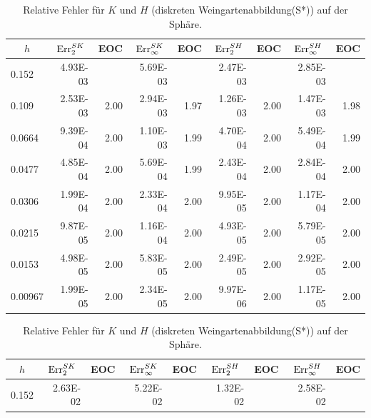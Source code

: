   
   \begin{table}[htbp]
      \begin{tabular}{|l|r|r|r|r|r|r|r|r|}
      \hline
      \multicolumn{1}{|c|}{\rule{0pt}{11pt}\( h \)} & \multicolumn{1}{c|}{\( \text{Err}_{2}^{SK} \)} & \multicolumn{1}{c|}{EOC} & 
           \multicolumn{1}{c|}{\( \text{Err}_{\infty}^{SK} \)} & \multicolumn{1}{c|}{EOC} & \multicolumn{1}{c|}{\( \text{Err}_{2}^{SH} \)} &
           \multicolumn{1}{c|}{EOC} & \multicolumn{1}{c|}{\( \text{Err}_{\infty}^{SH} \)} & \multicolumn{1}{c|}{EOC} \\ \hline
      0.152 & 4.93E-03 & \multicolumn{1}{l|}{} & 5.69E-03 & \multicolumn{1}{l|}{} & 2.47E-03 & \multicolumn{1}{l|}{} & 2.85E-03 & \multicolumn{1}{l|}{} \\ \hline
      0.109 & 2.53E-03 & 2.00 & 2.94E-03 & 1.97 & 1.26E-03 & 2.00 & 1.47E-03 & 1.98 \\ \hline
      0.0664 & 9.39E-04 & 2.00 & 1.10E-03 & 1.99 & 4.70E-04 & 2.00 & 5.49E-04 & 1.99 \\ \hline
      0.0477 & 4.85E-04 & 2.00 & 5.69E-04 & 1.99 & 2.43E-04 & 2.00 & 2.84E-04 & 2.00 \\ \hline
      0.0306 & 1.99E-04 & 2.00 & 2.33E-04 & 2.00 & 9.95E-05 & 2.00 & 1.17E-04 & 2.00 \\ \hline
      0.0215 & 9.87E-05 & 2.00 & 1.16E-04 & 2.00 & 4.93E-05 & 2.00 & 5.79E-05 & 2.00 \\ \hline
      0.0153 & 4.98E-05 & 2.00 & 5.83E-05 & 2.00 & 2.49E-05 & 2.00 & 2.92E-05 & 2.00 \\ \hline
      0.00967 & 1.99E-05 & 2.00 & 2.34E-05 & 2.00 & 9.97E-06 & 2.00 & 1.17E-05 & 2.00 \\ \hline
      \end{tabular}
      \caption[Weingarten auf der Sphäre]{Relative Fehler für \( K \) und \( H \) (diskreten Weingartenabbildung(S*)) auf der Sphäre.}
      \label{tabSphereWeingarten}
      \vspace{10pt}
      \begin{tabular}{|l|r|r|r|r|r|r|r|r|}
      \hline
      \multicolumn{1}{|c|}{\rule{0pt}{11pt}\( h \)} & \multicolumn{1}{c|}{\( \text{Err}_{2}^{SK} \)} & \multicolumn{1}{c|}{EOC} & 
           \multicolumn{1}{c|}{\( \text{Err}_{\infty}^{SK} \)} & \multicolumn{1}{c|}{EOC} & \multicolumn{1}{c|}{\( \text{Err}_{2}^{SH} \)} &
           \multicolumn{1}{c|}{EOC} & \multicolumn{1}{c|}{\( \text{Err}_{\infty}^{SH} \)} & \multicolumn{1}{c|}{EOC} \\ \hline
           0.152 & 2.63E-02 & \multicolumn{1}{l|}{} & 5.22E-02 & \multicolumn{1}{l|}{} & 1.32E-02 & \multicolumn{1}{l|}{} & 2.58E-02 & \multicolumn{1}{l|}{} \\ \hline

\end{tabular}
\end{table}
